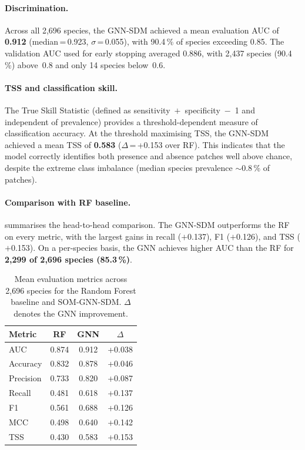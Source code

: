 \paragraph{Discrimination.}
Across all 2,696 species, the GNN-SDM achieved a mean evaluation
AUC of \textbf{0.912} (median\,=\,0.923, $\sigma$\,=\,0.055),
with 90.4\,\% of species exceeding 0.85. The validation AUC used
for early stopping averaged 0.886, with 2,437 species
(90.4\,\%) above~0.8 and only 14 species below~0.6.

\paragraph{TSS and classification skill.}
The True Skill Statistic (defined as
sensitivity~$+$~specificity~$-$~1 and independent of
prevalence) provides a threshold-dependent measure of
classification accuracy. At the threshold maximising TSS, the
GNN-SDM achieved a mean TSS of \textbf{0.583}
($\Delta$\,=\,+0.153 over RF). This indicates that the model
correctly identifies both presence and absence patches well
above chance, despite the extreme class imbalance (median
species prevalence ${\sim}$0.8\,\% of patches).

\paragraph{Comparison with RF baseline.}
 summarises the head-to-head comparison.  The
GNN-SDM outperforms the RF on every metric, with the largest
gains in recall ($+$0.137), F1 ($+$0.126), and TSS ($+$0.153).
On a per-species basis, the GNN achieves higher AUC than the RF
for \textbf{2,299 of 2,696 species (85.3\,\%)}.

\begin{table}[htbp]
  \centering
  \caption{Mean evaluation metrics across 2,696 species for the
  Random Forest baseline and SOM-GNN-SDM. $\Delta$ denotes the
  GNN improvement.}
  \label{tab:gnn-rf}
  \small
  \begin{tabular}{lccc}
    \toprule
    Metric & RF & GNN & $\Delta$ \\
    \midrule
    AUC       & 0.874 & 0.912 & +0.038 \\
    Accuracy  & 0.832 & 0.878 & +0.046 \\
    Precision & 0.733 & 0.820 & +0.087 \\
    Recall    & 0.481 & 0.618 & +0.137 \\
    F1        & 0.561 & 0.688 & +0.126 \\
    MCC       & 0.498 & 0.640 & +0.142 \\
    TSS       & 0.430 & 0.583 & +0.153 \\
    \bottomrule
  \end{tabular}
\end{table}

